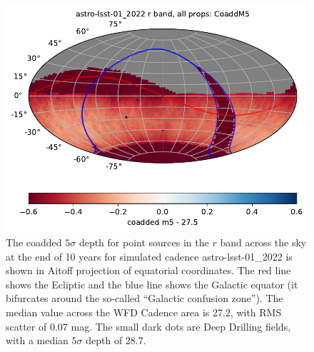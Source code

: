 \documentclass[DM,lsstdraft,authoryear,toc]{lsstdoc}
\begin{document}
\begin{figure}[t!]
\includegraphics[angle=0,width=0.99\hsize,clip]{figures/astro-lsst-01_2022_CoaddM5_r_band_all_props_OPSI_SkyMap}
\caption{The coadded $5\sigma$ depth for point sources in the $r$ band
across the sky at the end of 10 years for simulated cadence astro-lsst-01\_2022 is shown
in Aitoff projection of equatorial coordinates. The red line shows the Ecliptic and
the blue line shows the Galactic equator (it bifurcates around the so-called
``Galactic confusion zone''). The median value across the WFD Cadence area
is 27.2, with RMS scatter of 0.07 mag. The small dark dots are Deep Drilling
fields, with a median $5\sigma$ depth of 28.7.}
\label{fig:baseline_coaddm5}
\end{figure}
\end{document}
